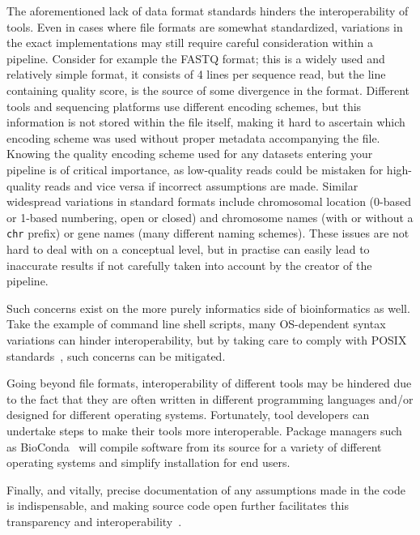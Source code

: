 \begin{justify}
The aforementioned lack of data format standards hinders the interoperability of tools. Even in cases where file formats are somewhat standardized, variations in the exact implementations may still require careful consideration within a pipeline. Consider for example the FASTQ format; this is a widely used and relatively simple format, it consists of 4 lines per sequence read, but the line containing quality score, is the source of some divergence in the format. Different tools and sequencing platforms use different encoding schemes, but this information is not stored within the file itself, making it hard to ascertain which encoding scheme was used without proper metadata accompanying the file. Knowing the quality encoding scheme used for any datasets entering your pipeline is of critical importance, as low-quality reads could be mistaken for high-quality reads and vice versa if incorrect assumptions are made. Similar widespread variations in standard formats include chromosomal location (0-based or 1-based numbering, open or closed) and chromosome names (with or without a \verb+chr+ prefix) or gene names (many different naming schemes). These issues are not hard to deal with on a conceptual level, but in practise can easily lead to inaccurate results if not carefully taken into account by the creator of the pipeline.

Such concerns exist on the more purely informatics side of bioinformatics as well. Take the example of command line shell scripts, many OS-dependent syntax variations can hinder interoperability, but by taking care to comply with POSIX standards~\cite{walli1995posix}, such concerns can be mitigated.

Going beyond file formats, interoperability of different tools may be hindered due to the fact that they are often written in different programming languages and/or designed for different operating systems. Fortunately, tool developers can undertake steps to make their tools more interoperable. Package managers such as BioConda~\cite{gruning2017bioconda} will compile software from its source for a variety of different operating systems and simplify installation for end users.

Finally, and vitally, precise documentation of any assumptions made in the code is indispensable, and making source code open further facilitates this transparency and interoperability~\cite{ince2012case}.



\end{justify}

